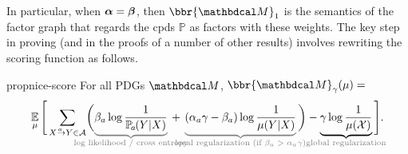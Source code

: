 In particular, when $\boldsymbol\alpha = \boldsymbol\beta$, then $\bbr{\dg M}_1$ is the semantics of the factor graph that regards the cpds $\mathbb P$ as factors with these weights. 
The key step in proving 
(and in the proofs of a number of other results) involves 
rewriting  
the scoring function 
as follows.

\begin{linked}{prop}{nice-score}%
    \def\xinw{X}
    \def\yinw{Y}
For all PDGs $\dg M$, 
$\bbr{\dg M}_\gamma(\mu) = $
\begin{equation}\label{eq:semantics-breakdown}
    \Ex_{\mu}
    \Bigg[
     \sum_{ \ed aXY \in \Ar }
     \!
    \bigg(
        {\color{gray}
        \underbrace{\color{black}
          \beta_a \log \frac{1}{\p_a(\yinw | \xinw)}
    	}_{\color{gray}\smash{\mathclap{\text{log likelihood / cross entropy}}}}} \,+\,
        {\color{gray}\underbrace{\color{black} 
    ({\alpha_a}\gamma - \beta_a ) \log \frac{1}{\mu(\yinw |\xinw)} 
    	}_{\color{gray}\smash{\mathclap{\text{local regularization (if $\beta_a > 
    	\alpha_a
    	\gamma$)}}}}}\,\bigg) - \underbrace{\color{black}
    \gamma \log \frac{1}{\mu(\X)}
    	}_{\color{gray}\smash{\mathclap{\text{global
            regularization}}}}\color{black} \Bigg].
\end{equation}
\end{linked}
